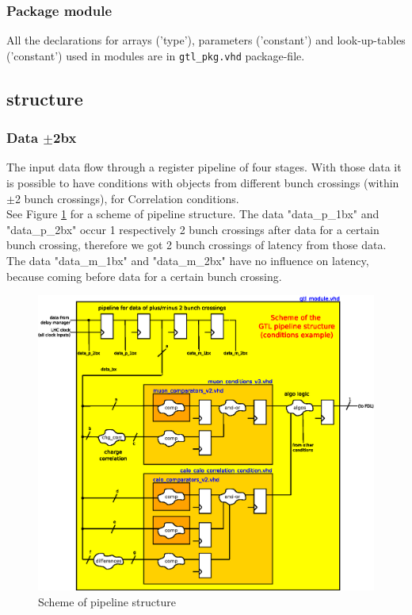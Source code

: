 \subsubsection{Package module}
\label{sec:gtl:package_module}

All the declarations for arrays ('type'), parameters ('constant') and look-up-tables ('constant') used in modules are in \texttt{gtl\_pkg.vhd} package-file.

\clearpage

\subsection{\ugtl structure}
\label{sec:gtl:mgtl_structure}

\subsubsection{Data $\pm$2bx}
\label{sec:gtl:data_p_m_2bx}

The \ugtl input data flow through a register pipeline of four stages. With those data it is possible to have conditions with objects from
different bunch crossings (within $\pm$2 bunch crossings), \eg for Correlation conditions.\\
See Figure \ref{fig:gtl:gtl_pipeline} for a scheme of \ugtl pipeline structure. The data "data\_p\_1bx" and "data\_p\_2bx" occur 1 respectively 2 bunch crossings
after data for a certain bunch crossing, therefore we got 2 bunch crossings of latency from those data. The data "data\_m\_1bx" and "data\_m\_2bx" have no influence
on latency, because coming before data for a certain bunch crossing.

\begin{figure}[htb]
\centering
\includegraphics[width=15cm]{figures/gtl_pipeline}
\caption{Scheme of \ugtl pipeline structure} 
\label{fig:gtl:gtl_pipeline}
\end{figure}

